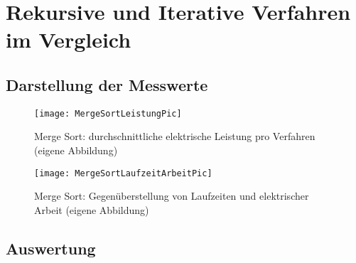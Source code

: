 \chapter{Rekursive und Iterative Verfahren im Vergleich}

\section{Darstellung der Messwerte}



\begin{figure}[H]
	\begin{center}	 
	\texttt{[image: MergeSortLeistungPic]}
	\caption{Merge Sort: durchschnittliche elektrische Leistung pro Verfahren (eigene Abbildung)}
	\label{fig:MergeSortLeistungPic} 
	\end{center}
\end{figure}



\begin{figure}[H]
	\begin{center}	 
	\texttt{[image: MergeSortLaufzeitArbeitPic]}
	\caption{Merge Sort: Gegenüberstellung von Laufzeiten und elektrischer Arbeit (eigene Abbildung)}
	\label{fig:MergeSortLaufzeitArbeitPic} 
	\end{center}
\end{figure}

\section{Auswertung}